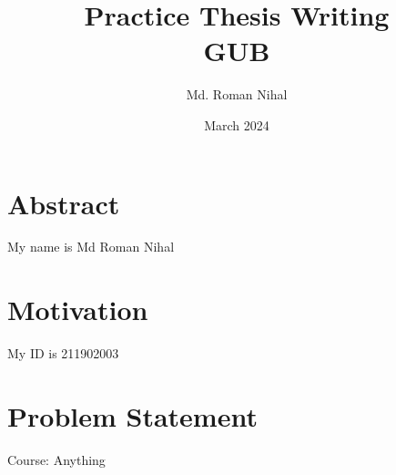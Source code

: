 \documentclass[twoside]{report}
\title{Practice Thesis Writing\\
{\Large GUB}}
\author{Md. Roman Nihal}
\date{March 2024}
\begin{document}
\maketitle

\chapter*{Abstract}
My name is Md Roman Nihal

\chapter*{Motivation}
My ID is 211902003

\chapter*{Problem Statement}
Course: Anything

\tableofcontents
\listoffigures




\appendix



\end{document}
